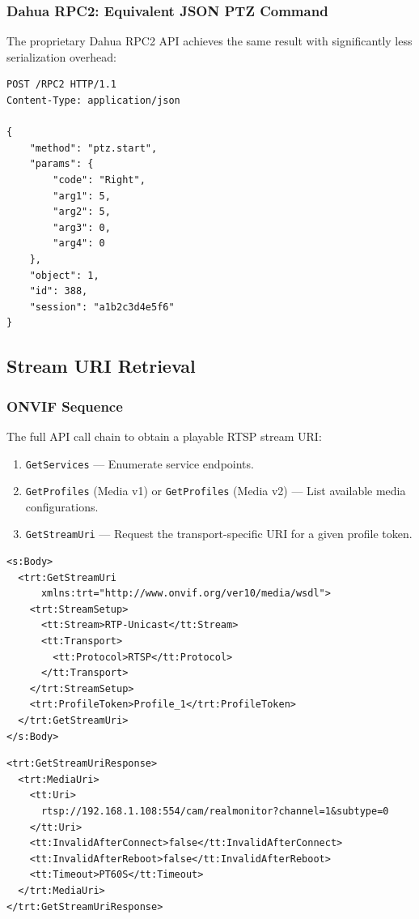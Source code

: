 \documentclass[12pt,a4paper]{article}
\begin{document}
\subsubsection{Dahua RPC2: Equivalent JSON PTZ Command}
The proprietary Dahua RPC2 API achieves the same result with significantly less serialization overhead:

\begin{lstlisting}[style=jsonstyle, caption=Dahua RPC2 PTZ Start Command]
POST /RPC2 HTTP/1.1
Content-Type: application/json

{
    "method": "ptz.start",
    "params": {
        "code": "Right",
        "arg1": 5,
        "arg2": 5,
        "arg3": 0,
        "arg4": 0
    },
    "object": 1,
    "id": 388,
    "session": "a1b2c3d4e5f6"
}
\end{lstlisting}

\subsection{Stream URI Retrieval}

\subsubsection{ONVIF Sequence}
The full API call chain to obtain a playable RTSP stream URI:
\begin{enumerate}
    \item \texttt{GetServices} --- Enumerate service endpoints.
    \item \texttt{GetProfiles} (Media v1) or \texttt{GetProfiles} (Media v2) --- List available media configurations.
    \item \texttt{GetStreamUri} --- Request the transport-specific URI for a given profile token.
\end{enumerate}

\begin{lstlisting}[style=xmlstyle, caption=ONVIF GetStreamUri SOAP Request]
<s:Body>
  <trt:GetStreamUri
      xmlns:trt="http://www.onvif.org/ver10/media/wsdl">
    <trt:StreamSetup>
      <tt:Stream>RTP-Unicast</tt:Stream>
      <tt:Transport>
        <tt:Protocol>RTSP</tt:Protocol>
      </tt:Transport>
    </trt:StreamSetup>
    <trt:ProfileToken>Profile_1</trt:ProfileToken>
  </trt:GetStreamUri>
</s:Body>
\end{lstlisting}

\begin{lstlisting}[style=xmlstyle, caption=ONVIF GetStreamUri SOAP Response]
<trt:GetStreamUriResponse>
  <trt:MediaUri>
    <tt:Uri>
      rtsp://192.168.1.108:554/cam/realmonitor?channel=1&subtype=0
    </tt:Uri>
    <tt:InvalidAfterConnect>false</tt:InvalidAfterConnect>
    <tt:InvalidAfterReboot>false</tt:InvalidAfterReboot>
    <tt:Timeout>PT60S</tt:Timeout>
  </trt:MediaUri>
</trt:GetStreamUriResponse>
\end{lstlisting}
\end{document}
